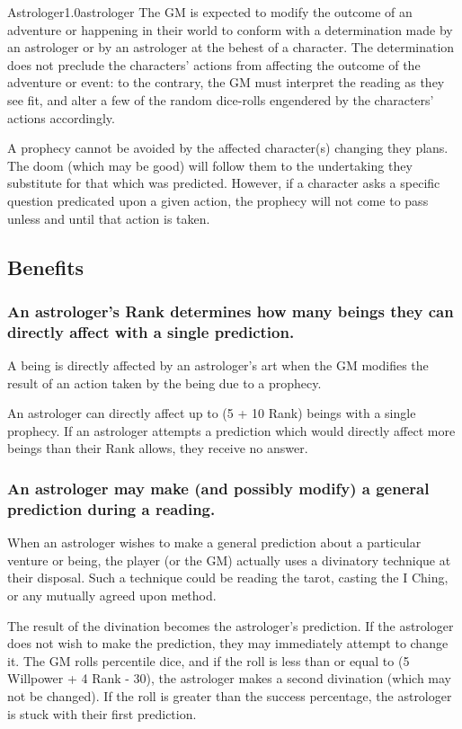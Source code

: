 \begin{skill}{Astrologer}{1.0}{astrologer}
The GM is expected to modify the outcome of an adventure or happening
in their world to conform with a determination made by an astrologer or
by an astrologer at the behest of a character.  The determination does
not preclude the characters' actions from affecting the outcome of the
adventure or event: to the contrary, the GM must interpret the reading
as they see fit, and alter a few of the random dice-rolls engendered
by the characters' actions accordingly.

A prophecy cannot be avoided by the affected character(s) changing
they plans.  The doom (which may be good) will follow them to the
undertaking they substitute for that which was predicted. However, if
a character asks a specific question predicated upon a given action,
the prophecy will not come to pass unless and until that action is
taken.

\subsection{Benefits}

\subsubsection{An astrologer's Rank determines how many beings they can
directly affect with a single prediction.}

A being is directly affected by an astrologer's art when the GM
modifies the result of an action taken by the being due to a prophecy.

An astrologer can directly affect up to (5 + 10 \x Rank) beings with a
single prophecy.  If an astrologer attempts a prediction which would
directly affect more beings than their Rank allows, they receive no
answer.

\subsubsection{An astrologer may make (and possibly modify) a general
prediction during a reading.}

When an astrologer wishes to make a general prediction about a
particular venture or being, the player (or the GM) actually uses a
divinatory technique at their disposal.  Such a technique could be
reading the tarot, casting the I Ching, or any mutually agreed upon
method.

The result of the divination becomes the astrologer's prediction. If
the astrologer does not wish to make the prediction, they may
immediately attempt to change it.  The GM rolls percentile dice, and
if the roll is less than or equal to (5 \x Willpower + 4
\x Rank - 30), the astrologer makes a second divination (which
may not be changed).  If the roll is greater than the success
percentage, the astrologer is stuck with their first prediction.


\end{skill}

